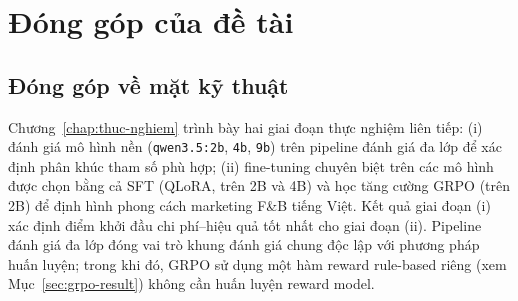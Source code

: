 \section{Đóng góp của đề tài}\label{sec:dong-gop}

\subsection{Đóng góp về mặt kỹ thuật}

Chương~\ref{chap:thuc-nghiem} trình bày hai giai đoạn thực nghiệm liên
tiếp: (i) đánh giá mô hình nền (\texttt{qwen3.5:2b}, \texttt{4b},
\texttt{9b}) trên pipeline đánh giá đa lớp để xác định phân khúc tham
số phù hợp; (ii) fine-tuning chuyên biệt trên các mô hình được chọn
bằng cả SFT (QLoRA, trên 2B và 4B) và học tăng cường GRPO (trên 2B)
để định hình phong cách marketing F\&B tiếng Việt. Kết quả giai đoạn
(i) xác định điểm khởi đầu chi phí--hiệu quả tốt nhất cho giai đoạn
(ii). Pipeline đánh giá đa lớp đóng vai trò khung đánh giá chung độc
lập với phương pháp huấn luyện; trong khi đó, GRPO sử dụng một hàm
reward rule-based riêng (xem Mục~\ref{sec:grpo-result}) không cần
huấn luyện reward model.


